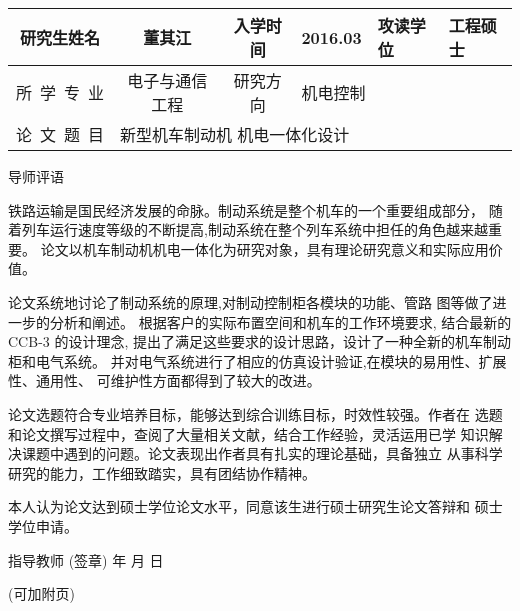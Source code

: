 \documentclass[a4paper,12pt]{article}
\newcommand*{\kaishu}{\CJKfamily{kaiti}}     %
\newcommand*{\heiti}{\CJKfamily{heiti}}     %
\begin{document}
\pagestyle{empty}
\fontsize{12}{16}\selectfont
\begin{center}
\begin{tabularx}{\textwidth}{c|c|c|c|c|X|X}
研究生姓名 & \multicolumn{2}{c|}{董其江} & 入学时间 & 2016.03 & 攻读学位
        & 工程硕士\\\hline
所~学~专~业   & \multicolumn{2}{c|}{电子与通信工程}
        & 研究方向 & \multicolumn{3}{l}{机电控制}\\\hline
论~文~题~目 & \multicolumn{6}{l}{新型机车制动机 机电一体化设计}\\\hline
\end{tabularx}
\vskip 8mm
\Large \kaishu 导师评语\end{center}

\fontsize{12}{14}\selectfont

铁路运输是国民经济发展的命脉。制动系统是整个机车的一个重要组成部分，
随着列车运行速度等级的不断提高,制动系统在整个列车系统中担任的角色越来越重要。
论文以机车制动机机电一体化为研究对象，具有理论研究意义和实际应用价值。

论文系统地讨论了制动系统的原理,对制动控制柜各模块的功能、管路
图等做了进一步的分析和阐述。
根据客户的实际布置空间和机车的工作环境要求, 结合最新的 CCB-3 的设计理念,
提出了满足这些要求的设计思路，设计了一种全新的机车制动柜和电气系统。
并对电气系统进行了相应的仿真设计验证,在模块的易用性、扩展性、通用性、
可维护性方面都得到了较大的改进。

论文选题符合专业培养目标，能够达到综合训练目标，时效性较强。作者在
选题和论文撰写过程中，查阅了大量相关文献，结合工作经验，灵活运用已学
知识解决课题中遇到的问题。论文表现出作者具有扎实的理论基础，具备独立
从事科学研究的能力，工作细致踏实，具有团结协作精神。

本人认为论文达到硕士学位论文水平，同意该生进行硕士研究生论文答辩和
硕士学位申请。

\vfill
\hfill {\heiti 指导教师} \underline{\hskip 35mm} (签章)\qquad\qquad
\vskip 5mm
\hfill 年\hskip 12mm 月\hskip 12mm 日\qquad\qquad

\noindent(可加附页)
\end{document}
